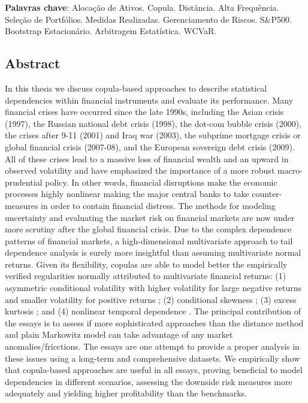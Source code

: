 \documentclass[a4paper,12pt]{report}
\begin{document}
	\noindent
	\textbf{Palavras chave}: Alocação de Ativos. Copula. Distância. Alta Frequência. Seleção de Portfólios. Medidas Realizadas. Gerenciamento de Riscos. S\&P500. Bootstrap Estacionário. Arbitragem Estatística. WCVaR.
	
	\clearpage
	
	\begin{center}
		\section*{Abstract}
	\end{center}
	
	\setlength{\baselineskip}{12pt}
	\noindent \rm In this thesis we discuss copula-based approaches to describe statistical dependencies within financial instruments and evaluate its performance. Many financial crises have occurred since the late 1990s, including the Asian crisis (1997), the Russian national debt crisis (1998), the dot-com bubble crisis (2000), the crises after 9-11 (2001) and Iraq war (2003), the subprime mortgage crisis or global financial crisis (2007-08), and the European sovereign debt crisis (2009). All of these crises lead to a massive loss of financial wealth and an upward in observed volatility and have emphasized the importance of a more robust macro-prudential policy. In other words, financial disruptions make the economic processes highly nonlinear making the major central banks to take counter-measures in order to contain financial distress. The methods for modeling uncertainty and evaluating the market risk on financial markets are now under more scrutiny after the global financial crisis. Due to the complex dependence patterns of financial markets, a high-dimensional multivariate approach to tail dependence analysis is surely more insightful than assuming multivariate normal returns. Given its flexibility, copulas are able to model better the empirically verified regularities normally attributed to multivariate financial returns: (1) asymmetric conditional volatility with higher volatility for large negative returns and smaller volatility for positive returns \citep{h98}; (2) conditional skewness \citep{ait01,chen01,patton01}; (3) excess kurtosis \citep{t01,andreou01}; and (4) nonlinear temporal dependence \citep{cont01,campbell97}. The principal contribution of the essays is to assess if more sophisticated approaches than the distance method and plain Markowitz model can take advantage of any market anomalies/fricctions. The essays are one attempt to provide a proper analysis in these issues using a long-term and comprehensive datasets. We empirically show that copula-based approaches are useful in all essays, proving beneficial to model dependencies in different scenarios, assessing the downside risk measures more adequately and yielding higher profitability than the benchmarks. \\
	
\end{document}
